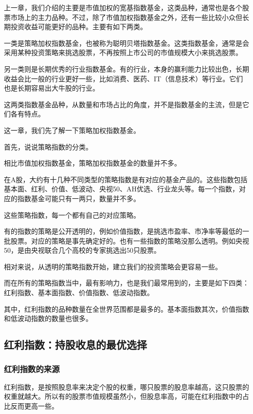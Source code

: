 
上一章，我们介绍的主要是市值加权的宽基指数基金，这类品种，通常也是各个股票市场上的主力品种。不过，除了市值加权指数基金之外，还有一些比较小众但长期投资收益可能更好的品种。主要有如下两类。

一类是策略加权指数基金，也被称为聪明贝塔指数基金。这类指数基金，通常是会采用某种投资策略来挑选股票，不再按照上市公司的市值规模大小来挑选股票。

另一类则是长期优秀的行业指数基金。有的行业，本身的赢利能力比较出色，长期收益会比一般的行业更好一些，比如消费、医药、IT（信息技术）等行业。它们也是长期容易出大牛股的行业。

这两类指数基金品种，从数量和市场占比的角度，并不是指数基金的主流，但是它们各有特点。

这一章，我们先了解一下策略加权指数基金。

首先，说说策略指数的分类。

相比市值加权指数基金，策略加权指数基金的数量并不多。

在A股，大约有十几种不同类型的策略指数是有对应的基金产品的。这些指数包括基本面、红利、价值、低波动、央视50、AH优选、行业龙头等。每一个指数，对应的指数基金可能只有一两只，数量并不多。

这些策略指数，每一个都有自己的对应策略。

有的指数的策略是公开透明的，例如价值指数，是挑选市盈率、市净率等最低的一批股票。对应的策略是事先确定好的。也有一些指数的策略没那么透明。例如央视50，是由央视联合几个高校的专家挑选出50只股票。

相对来说，从透明的策略指数开始，建立我们的投资策略会更容易一些。

而在所有的策略指数当中，最有影响力，也是我们最常用到的，主要是如下四类：红利指数、基本面指数、价值指数、低波动指数。

其中，红利指数的品种数量在全世界范围都是最多的。基本面指数其次，价值指数和低波动指数的数量也很多。

\subsection{红利指数：持股收息的最优选择}
\subsubsection{红利指数的来源}

红利指数，是按照股息率来决定个股的权重，哪只股票的股息率越高，这只股票的权重就越大。所以有的股票市值规模虽然小，但股息率高，可能在红利指数中的占比反而更高一些。

